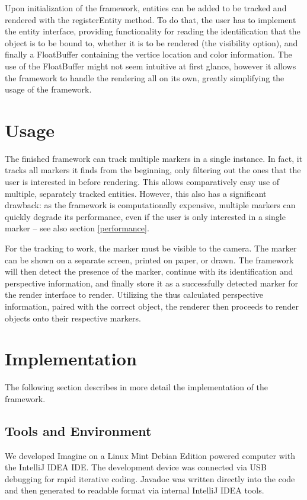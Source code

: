 Upon initialization of the framework, entities can be added to be tracked and rendered with the registerEntity method.
To do that, the user has to implement the entity interface, providing functionality for reading the identification that the object is to be bound to, whether it is to be rendered (the visibility option), and finally a FloatBuffer containing the vertice location and color information.
The use of the FloatBuffer might not seem intuitive at first glance, however it allows the framework to handle the rendering all on its own, greatly simplifying the usage of the framework.

\section{Usage}

The finished framework can track multiple markers in a single instance.
In fact, it tracks all markers it finds from the beginning, only filtering out the ones that the user is interested in before rendering.
This allows comparatively easy use of multiple, separately tracked entities.
However, this also has a significant drawback: as the framework is computationally expensive, multiple markers can quickly degrade its performance, even if the user is only interested in a single marker – see also section \ref{performance}.

For the tracking to work, the marker must be visible to the camera.
The marker can be shown on a separate screen, printed on paper, or drawn.
The framework will then detect the presence of the marker, continue with its identification and perspective information, and finally store it as a successfully detected marker for the render interface to render.
Utilizing the thus calculated perspective information, paired with the correct object, the renderer then proceeds to render objects onto their respective markers.

\section{Implementation}

The following section describes in more detail the implementation of the framework.

\subsection{Tools and Environment}

We developed Imagine on a Linux Mint Debian Edition powered computer with the IntelliJ IDEA IDE\cite{idea}.
The development device was connected via USB debugging for rapid iterative coding.
Javadoc was written directly into the code and then generated to readable format via internal IntelliJ IDEA tools.

